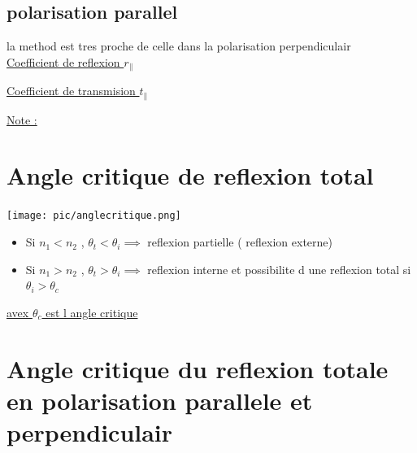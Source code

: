 \documentclass[12pt]{book}
\begin{document}
            \subsection{polarisation parallel}
                la method est tres proche de celle dans la polarisation perpendiculair \\
                \underline{Coefficient de reflexion $r_\parallel$}
                \begin{center}
                \end{center}
                \underline{Coefficient de transmision $t_\parallel$}
                \begin{center}
                \end{center}
                \underline{Note :} \\
                \begin{center}
                \end{center}
                \pagebreak
        \section{Angle critique de reflexion total}
            \texttt{[image: pic/anglecritique.png]}
            \begin{itemize}
                \item Si $n_1 < n_2$ , $\theta_t < \theta_i \implies $ reflexion partielle ( reflexion externe)
                \item Si $n_1 > n_2$ , $\theta_t > \theta_i \implies $ reflexion interne et possibilite d une reflexion total si $\theta_i > \theta_c$
            \end{itemize}
            \underline{avex $\theta_c$ est l angle critique}
        \section{Angle critique du reflexion totale en polarisation parallele et perpendiculair}
\end{document}
